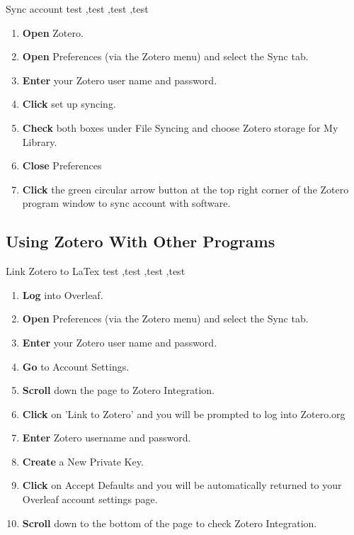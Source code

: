 \documentclass[10pt,a4paper]{article}
\begin{document}
\begin{textbox}{Sync account}
test  \sep test \sep test \sep test

\bigskip

\begin{enumerate}
\item \textbf{Open} Zotero.
\item \textbf{Open} Preferences (via the Zotero menu) and select the Sync tab.
\item \textbf {Enter} your Zotero user name and password.
\item \textbf {Click} set up syncing.
\item \textbf {Check} both boxes under File Syncing and choose Zotero storage for My Library.
\item \textbf {Close} Preferences
\item \textbf {Click} the green circular arrow button at the top right corner of the Zotero program window to sync account with software.
\end{enumerate}

\end{textbox}

\subsection{Using Zotero With Other Programs}

\begin{textbox}{Link Zotero to LaTex}
test  \sep test \sep test \sep test

\bigskip

\begin{enumerate}
\item \textbf{Log} into Overleaf.
\item \textbf{Open} Preferences (via the Zotero menu) and select the Sync tab.
\item \textbf {Enter} your Zotero user name and password.
\item \textbf {Go} to Account Settings.
\item \textbf {Scroll} down the page to Zotero Integration.
\item \textbf {Click} on 'Link to Zotero' and you will be prompted to log into Zotero.org
\item \textbf {Enter} Zotero username and password.
\item \textbf {Create} a New Private Key.
\item \textbf {Click} on Accept Defaults and you will be automatically returned to your Overleaf account settings page.
\item \textbf {Scroll} down to the bottom of the page to check Zotero Integration.
\end{enumerate}

\end{textbox}
\end{document}
